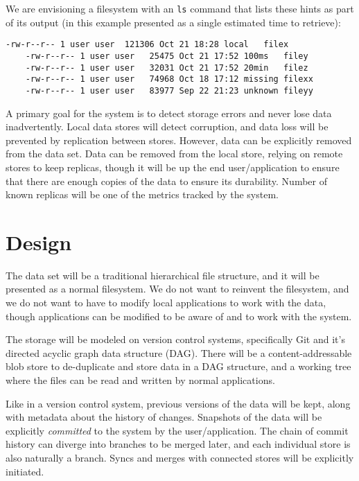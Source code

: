 \documentclass[12pt,a4paper,two-side]{book}
\newcommand{\newterm}{\textit}
\begin{document}
We are envisioning a filesystem with an \lstinline{ls} command that lists these
hints as part of its output (in this example presented as a single estimated
time to retrieve):

\begin{lstlisting}[caption=Example ls output]
    -rw-r--r-- 1 user user  121306 Oct 21 18:28 local   filex
    -rw-r--r-- 1 user user   25475 Oct 21 17:52 100ms   filey
    -rw-r--r-- 1 user user   32031 Oct 21 17:52 20min   filez
    -rw-r--r-- 1 user user   74968 Oct 18 17:12 missing filexx
    -rw-r--r-- 1 user user   83977 Sep 22 21:23 unknown fileyy
\end{lstlisting}

A primary goal for the system is to detect storage errors and never lose data
inadvertently. Local data stores will detect corruption, and data loss will be
prevented by replication between stores. However, data can be explicitly removed
from the data set. Data can be removed from the local store, relying on remote
stores to keep replicas, though it will be up the end user/application to ensure
that there are enough copies of the data to ensure its durability. Number of
known replicas will be one of the metrics tracked by the system.


\section{Design}\label{design}

The data set will be a traditional hierarchical file structure, and it will be
presented as a normal filesystem. We do not want to reinvent the filesystem, and
we do not want to have to modify local applications to work with the data,
though applications can be modified to be aware of and to work with the system.

The storage will be modeled on version control systems, specifically Git and
it's directed acyclic graph data structure (DAG). There will be a
content-addressable blob store to de-duplicate and store data in a DAG
structure, and a working tree where the files can be read and written by normal
applications.

Like in a version control system, previous versions of the data will be kept,
along with metadata about the history of changes. Snapshots of the data will be
explicitly \newterm{committed} to the system by the user/application. The chain
of commit history can diverge into branches to be merged later, and each
individual store is also naturally a branch. Syncs and merges with connected
stores will be explicitly initiated.
\end{document}
